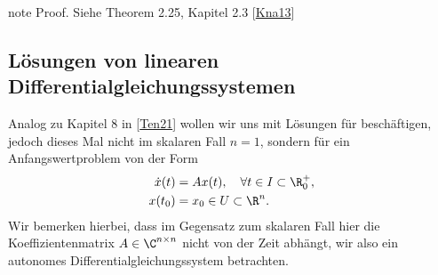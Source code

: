 \documentclass[letterpaper,10pt,english]{jupyterBook}
\begin{document}
\begin{sphinxadmonition}{note}
\sphinxAtStartPar
Proof. Siehe Theorem 2.25, Kapitel 2.3 {[}\hyperlink{cite.references:id5}{Kna13}{]}
\end{sphinxadmonition}


\subsection{Lösungen von linearen Differentialgleichungssystemen}
\label{\detokenize{ode/repetition:losungen-von-linearen-differentialgleichungssystemen}}\label{\detokenize{ode/repetition:s-lineare-dglsysteme}}
\sphinxAtStartPar
Analog zu Kapitel 8 in {[}\hyperlink{cite.references:id12}{Ten21}{]} wollen wir uns mit Lösungen für  beschäftigen, jedoch dieses Mal nicht im skalaren Fall \(n=1\), sondern für ein Anfangswertproblem von der Form
\begin{equation}\label{equation:ode/repetition:eq:lin_hom_dglsystem}
\begin{split}\dot{x}(t) &= A x(t), \quad \forall t \in I \subset \R^+_0, \\
x(t_0) &= x_0 \in U \subset \R^n.\end{split}
\end{equation}
\sphinxAtStartPar
Wir bemerken hierbei, dass im Gegensatz zum skalaren Fall hier die Koeffizientenmatrix \(A \in \C^{n\times n}\) nicht von der Zeit abhängt, wir also ein autonomes Differentialgleichungssystem betrachten.
\end{document}
